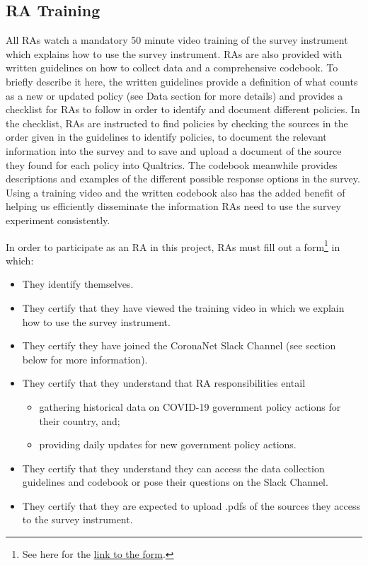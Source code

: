 \documentclass[
]{article}
\providecommand{\tightlist}{%
  \setlength{\itemsep}{0pt}\setlength{\parskip}{0pt}}
\begin{document}
\hypertarget{ra-training}{%
\subsection{RA Training}\label{ra-training}}

All RAs watch a mandatory 50 minute video training of the survey instrument which explains how to use the survey instrument. RAs are also provided with written guidelines on how to collect data and a comprehensive codebook. To briefly describe it here, the written guidelines provide a definition of what counts as a new or updated policy (see Data section for more details) and provides a checklist for RAs to follow in order to identify and document different policies. In the checklist, RAs are instructed to find policies by checking the sources in the order given in the guidelines to identify policies, to document the relevant information into the survey and to save and upload a document of the source they found for each policy into Qualtrics. The codebook meanwhile provides descriptions and examples of the different possible response options in the survey. Using a training video and the written codebook also has the added benefit of helping us efficiently disseminate the information RAs need to use the survey experiment consistently.

In order to participate as an RA in this project, RAs must fill out a form\footnote{See here for the \href{https://docs.google.com/forms/d/e/1FAIpQLSeybAW0DC0UE1x2EqLiTifVFuSUxqJLGFB8VI4wVCG61tVYKg/viewform}{link to the form}.} in which:

\begin{itemize}
\tightlist
\item
  They identify themselves.
\item
  They certify that they have viewed the training video in which we explain how to use the survey instrument.
\item
  They certify they have joined the CoronaNet Slack Channel (see section below for more information).
\item
  They certify that they understand that RA responsibilities entail

  \begin{itemize}
  \tightlist
  \item
    gathering historical data on COVID-19 government policy actions for their country, and;
  \item
    providing daily updates for new government policy actions.
  \end{itemize}
\item
  They certify that they understand they can access the data collection guidelines and codebook or pose their questions on the Slack Channel.
\item
  They certify that they are expected to upload .pdfs of the sources they access to the survey instrument.
\end{itemize}
\end{document}
